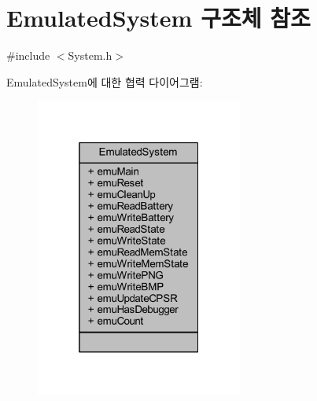 \hypertarget{struct_emulated_system}{}\section{Emulated\+System 구조체 참조}
\label{struct_emulated_system}


{\ttfamily \#include $<$System.\+h$>$}



Emulated\+System에 대한 협력 다이어그램\+:\nopagebreak
\begin{figure}[H]
\begin{center}
\leavevmode
\includegraphics[width=193pt]{struct_emulated_system__coll__graph}
\end{center}
\end{figure}
